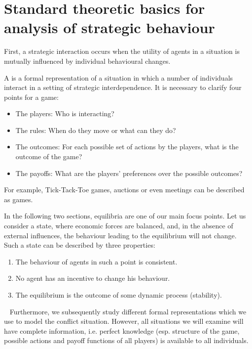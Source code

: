 

\chapter{Standard theoretic basics for analysis of strategic behaviour}

First, a strategic interaction occurs when the utility of agents in a situation is mutually influenced by individual behavioural changes. 

A  is a formal representation of a situation in which a number of individuals interact in a setting of strategic interdependence.
	It is necessary to clarify four points for a game:
	\begin{itemize}
		\item The players: Who is interacting?
		\item The rules: When do they move or what can they do?
		\item The outcomes: For each possible set of actions by the players, what is the outcome of the game?
		\item The payoffs: What are the players' preferences over the possible outcomes?
	\end{itemize}

For example, Tick-Tack-Toe games, auctions or even meetings can be described as games. 

In the following two sections, equilibria are one of our main focus points. Let us consider a state, where economic forces are balanced, and, in the absence of external influences, the behaviour leading to the equilibrium will not change. Such a state can be described by three properties: 
\begin{enumerate}
	\item The behaviour of agents in such a point is consistent.
	\item No agent has an incentive to change his behaviour.
	\item The equilibrium is the outcome of some dynamic process (stability).
\end{enumerate}

~\newline
Furthermore, we subsequently study different formal representations which we use to model the conflict situation. However, all situations we will examine will have complete information, i.e. perfect knowledge (esp. structure of the game, possible actions and payoff functions of all players) is available to all individuals. 


\newpage